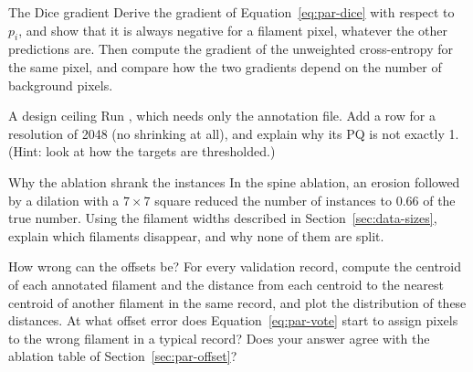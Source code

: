 \begin{exercise}{The Dice gradient}
Derive the gradient of Equation~\eqref{eq:par-dice} with respect to $p_i$, and show that it is
always negative for a filament pixel, whatever the other predictions are. Then compute the gradient
of the unweighted cross-entropy for the same pixel, and compare how the two gradients depend on the
number of background pixels.
\end{exercise}

\begin{exercise}{A design ceiling}
Run , which needs only the annotation
file. Add a row for a resolution of 2048 (no shrinking at all), and explain why its PQ is not
exactly 1. (Hint: look at how the targets are thresholded.)
\end{exercise}

\begin{exercise}{Why the ablation shrank the instances}
In the spine ablation, an erosion followed by a dilation with a $7\times7$ square reduced the number
of instances to 0.66 of the true number. Using the filament widths described in
Section~\ref{sec:data-sizes}, explain which filaments disappear, and why none of them are split.
\end{exercise}

\begin{exercise}{How wrong can the offsets be?}
For every validation record, compute the centroid of each annotated filament and the distance from
each centroid to the nearest centroid of another filament in the same record, and plot the
distribution of these distances. At what offset error does Equation~\eqref{eq:par-vote} start to
assign pixels to the wrong filament in a typical record? Does your answer agree with the ablation
table of Section~\ref{sec:par-offset}?
\end{exercise}
